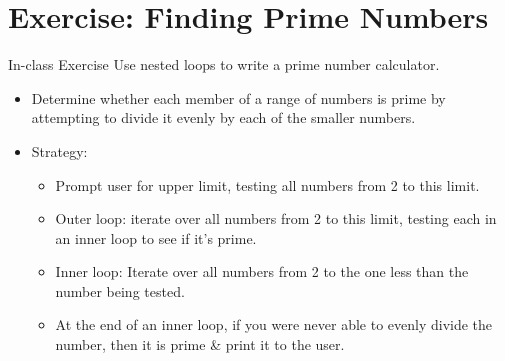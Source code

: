 \documentclass[graphics]{beamer}
\begin{document}
\section{Exercise: Finding Prime Numbers}
\begin{frame}{In-class Exercise}
    Use nested loops to write a prime number calculator.
    \begin{itemize}
        \item Determine whether each member of a range of numbers is prime by attempting to divide it evenly by each of the smaller numbers.
        \item Strategy:
        \begin{itemize}
            \item Prompt user for upper limit, testing all numbers from 2 to this limit.
            \item Outer loop: iterate over all numbers from 2 to this limit, testing each in an inner loop to see if it's prime.
            \item Inner loop: Iterate over all numbers from 2 to the one less than the number being tested.
            \item At the end of an inner loop, if you were never able to evenly divide the number, then it is prime \& print it to the user.
        \end{itemize}
    \end{itemize}
\end{frame}
\end{document}
